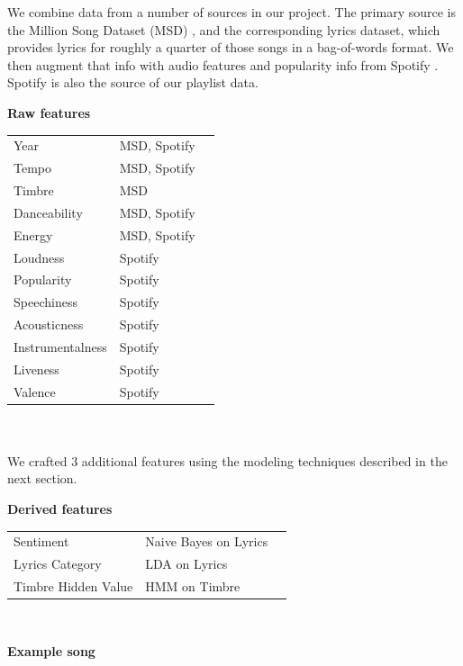 \documentclass[acmtog]{acmart}
\begin{document}
We combine data from a number of sources in our project. The primary source is the Million Song Dataset (MSD) \cite{msd}, and the corresponding lyrics dataset, which provides lyrics for roughly a quarter of those songs in a bag-of-words format. We then augment that info with audio features and popularity info from Spotify \cite{spotify}. Spotify is also the source of our playlist data.
\\
\begin{center} \textbf{Raw features} \end{center}
\begin{tabular}{lll}
Year              & MSD, Spotify    \\
Tempo             & MSD, Spotify    \\
Timbre            & MSD             \\
Danceability      & MSD, Spotify    \\
Energy            & MSD, Spotify    \\
Loudness          & Spotify         \\
Popularity        & Spotify         \\
Speechiness       & Spotify         \\
Acousticness      & Spotify         \\
Instrumentalness  & Spotify         \\
Liveness          & Spotify         \\
Valence           & Spotify         \\
\end{tabular}
\\\\
We crafted 3 additional features using the modeling techniques described in the next section.
\begin{center} \textbf{Derived features} \end{center}
\begin{tabular}{lll}
Sentiment             & Naive Bayes on Lyrics   \\
Lyrics Category       & LDA on Lyrics           \\
Timbre Hidden Value   & HMM on Timbre           \\
\end{tabular}
\\
\begin{center} \textbf{Example song} \end{center}
\end{document}
